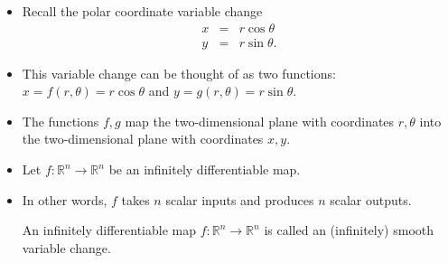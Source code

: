 \begin{frame}
\begin{itemize}
\item Recall the polar coordinate variable change
\[
\begin{array}{rcl}
x&=&r\cos \theta \\
y&=&r\sin \theta.
\end{array}
\]
\item This variable change can be thought of as two functions: $x=f(r, \theta)= r\cos \theta $ and $y=g(r,\theta)=r\sin \theta$.
\item The functions $f,g$ map the two-dimensional plane with coordinates $r,\theta$  into the two-dimensional plane with coordinates $x,y$.
\item Let $f:\mathbb R^n\to \mathbb R^n$ be an infinitely differentiable map.
\item In other words, $f$ takes $n$ scalar inputs and produces $n$ scalar outputs.
\begin{definition}
An infinitely differentiable map $f:\mathbb R^n\to \mathbb R^n$ is called an (infinitely) smooth variable change. 
\end{definition}
\end{itemize}
\end{frame}